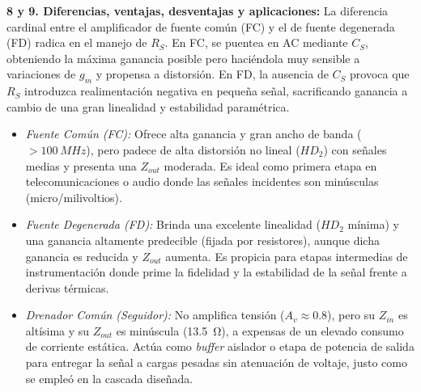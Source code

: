 \documentclass[conference]{IEEEtran}
\begin{document}
\textbf{8 y 9. Diferencias, ventajas, desventajas y aplicaciones:} La diferencia cardinal entre el amplificador de fuente común (FC) y el de fuente degenerada (FD) radica en el manejo de $R_S$. En FC, se puentea en AC mediante $C_S$, obteniendo la máxima ganancia posible pero haciéndola muy sensible a variaciones de $g_m$ y propensa a distorsión. En FD, la ausencia de $C_S$ provoca que $R_S$ introduzca realimentación negativa en pequeña señal, sacrificando ganancia a cambio de una gran linealidad y estabilidad paramétrica.
\begin{itemize}
    \item \emph{Fuente Común (FC):} Ofrece alta ganancia y gran ancho de banda ($>\SI{100}{MHz}$), pero padece de alta distorsión no lineal ($HD_2$) con señales medias y presenta una $Z_{out}$ moderada. Es ideal como primera etapa en telecomunicaciones o audio donde las señales incidentes son minúsculas (micro/milivoltios).
    \item \emph{Fuente Degenerada (FD):} Brinda una excelente linealidad ($HD_2$ mínima) y una ganancia altamente predecible (fijada por resistores), aunque dicha ganancia es reducida y $Z_{out}$ aumenta. Es propicia para etapas intermedias de instrumentación donde prime la fidelidad y la estabilidad de la señal frente a derivas térmicas.
    \item \emph{Drenador Común (Seguidor):} No amplifica tensión ($A_v \approx 0.8$), pero su $Z_{in}$ es altísima y su $Z_{out}$ es minúscula (\SI{13.5}{\ohm}), a expensas de un elevado consumo de corriente estática. Actúa como \emph{buffer} aislador o etapa de potencia de salida para entregar la señal a cargas pesadas sin atenuación de voltaje, justo como se empleó en la cascada diseñada.
\end{itemize}

\end{document}
